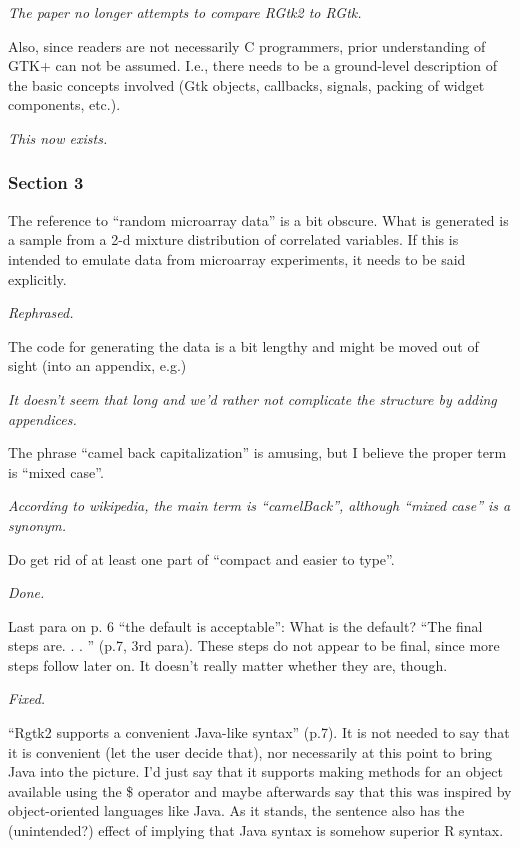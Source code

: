 \documentclass{article}
\begin{document}
\emph{The paper no longer attempts to compare RGtk2 to RGtk.}

Also, since readers are not necessarily C programmers,
prior understanding of GTK+ can not be assumed. I.e., there needs to be a
ground-level description of the basic concepts involved (Gtk objects, callbacks,
signals, packing of widget components, etc.).

\emph{This now exists.}

\subsubsection*{Section 3}

The reference to ``random microarray data'' is a bit obscure. What is generated
is a sample from a 2-d mixture distribution of correlated variables. If this
is intended to emulate data from microarray experiments, it needs to be said
explicitly. 

\emph{Rephrased.}

The code for generating the data is a bit lengthy and might be moved
out of sight (into an appendix, e.g.)

\emph{It doesn't seem that long and we'd rather not complicate the structure by adding appendices.}

The phrase ``camel back capitalization'' is amusing, but I believe the proper
term is ``mixed case''. 

\emph{According to wikipedia, the main term is ``camelBack'', although
``mixed case'' is a synonym.}

Do get rid of at least one part of ``compact and easier to type''.

\emph{Done.}

Last para on p. 6 ``the default is acceptable'': What is the default?
``The final steps are. . . '' (p.7, 3rd para). These steps do not appear to be final,
since more steps follow later on. It doesn't really matter whether they are,
though.

\emph{Fixed.}

``Rgtk2 supports a convenient Java-like syntax'' (p.7). It is not needed to say
that it is convenient (let the user decide that), nor necessarily at this point to
bring Java into the picture. I'd just say that it supports making methods for an
object available using the \$ operator and maybe afterwards say that this was
inspired by object-oriented languages like Java. As it stands, the sentence also
has the (unintended?) effect of implying that Java syntax is somehow superior
R syntax.
\end{document}
